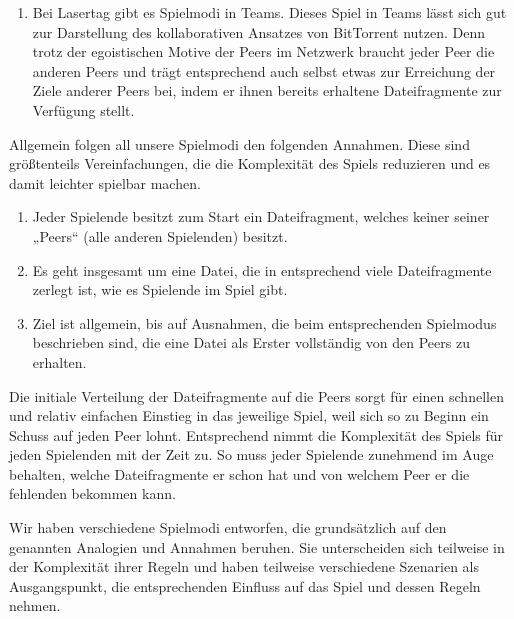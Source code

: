 \begin{enumerate}
\item Bei Lasertag gibt es Spielmodi in Teams. Dieses Spiel in Teams lässt sich gut zur Darstellung des kollaborativen Ansatzes von BitTorrent nutzen. Denn trotz der egoistischen Motive der Peers im Netzwerk braucht jeder Peer die anderen Peers und trägt entsprechend auch selbst etwas zur Erreichung der Ziele anderer Peers bei, indem er ihnen bereits erhaltene Dateifragmente zur Verfügung stellt.
\end{enumerate}

\noindent
Allgemein folgen all unsere Spielmodi den folgenden Annahmen. Diese sind größtenteils Vereinfachungen, die die Komplexität des Spiels reduzieren und es damit leichter spielbar machen.

\begin{enumerate}
\item Jeder Spielende besitzt zum Start ein Dateifragment, welches keiner seiner „Peers“ (alle anderen Spielenden) besitzt.
\item Es geht insgesamt um eine Datei, die in entsprechend viele Dateifragmente zerlegt ist, wie es Spielende im Spiel gibt.
\item Ziel ist allgemein, bis auf Ausnahmen, die beim entsprechenden Spielmodus beschrieben sind, die eine Datei als Erster vollständig von den Peers zu erhalten.
\end{enumerate}

\noindent
Die initiale Verteilung der Dateifragmente auf die Peers sorgt für einen schnellen und relativ einfachen Einstieg in das jeweilige Spiel, weil sich so zu Beginn ein Schuss auf jeden Peer lohnt. Entsprechend nimmt die Komplexität des Spiels für jeden Spielenden mit der Zeit zu. So muss jeder Spielende zunehmend im Auge behalten, welche Dateifragmente er schon hat und von welchem Peer er die fehlenden bekommen kann.

Wir haben verschiedene Spielmodi entworfen, die grundsätzlich auf den genannten Analogien und Annahmen beruhen. Sie unterscheiden sich teilweise in der Komplexität ihrer Regeln und haben teilweise verschiedene Szenarien als Ausgangspunkt, die entsprechenden Einfluss auf das Spiel und dessen Regeln nehmen.
